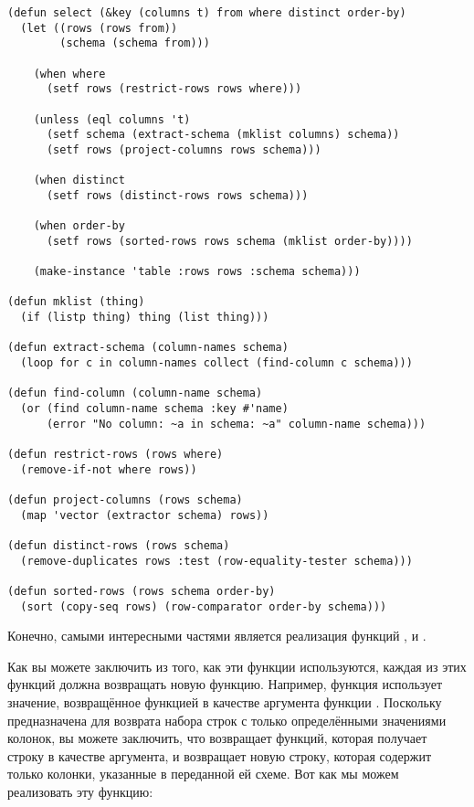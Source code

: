 \begin{lstlisting}
(defun select (&key (columns t) from where distinct order-by)
  (let ((rows (rows from))
        (schema (schema from)))

    (when where
      (setf rows (restrict-rows rows where)))

    (unless (eql columns 't)
      (setf schema (extract-schema (mklist columns) schema))
      (setf rows (project-columns rows schema)))

    (when distinct
      (setf rows (distinct-rows rows schema)))

    (when order-by
      (setf rows (sorted-rows rows schema (mklist order-by))))

    (make-instance 'table :rows rows :schema schema)))

(defun mklist (thing)
  (if (listp thing) thing (list thing)))

(defun extract-schema (column-names schema)
  (loop for c in column-names collect (find-column c schema)))

(defun find-column (column-name schema)
  (or (find column-name schema :key #'name)
      (error "No column: ~a in schema: ~a" column-name schema)))

(defun restrict-rows (rows where)
  (remove-if-not where rows))

(defun project-columns (rows schema)
  (map 'vector (extractor schema) rows))

(defun distinct-rows (rows schema)
  (remove-duplicates rows :test (row-equality-tester schema)))

(defun sorted-rows (rows schema order-by)
  (sort (copy-seq rows) (row-comparator order-by schema)))
\end{lstlisting}

Конечно, самыми интересными частями  является реализация функций
,  и .

Как вы можете заключить из того, как эти функции используются, каждая из этих функций
должна возвращать новую функцию.  Например, функция  использует
значение, возвращённое функцией  в качестве аргумента функции .
Поскольку  предназначена для возврата набора строк с только
определёнными значениями колонок, вы можете заключить, что  возвращает
функций, которая получает строку в качестве аргумента, и возвращает новую строку, которая
содержит только колонки, указанные в переданной ей схеме.  Вот как мы можем реализовать
эту функцию:

